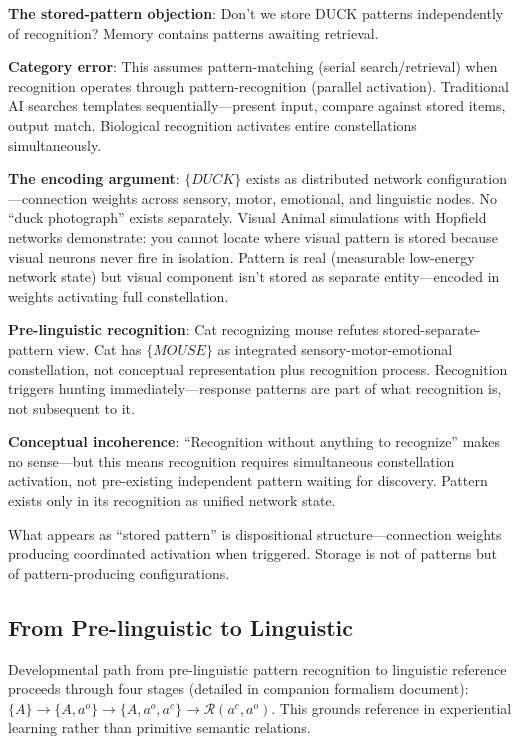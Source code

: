 \documentclass[12pt]{article}
\begin{document}
\textbf{The stored-pattern objection}: Don't we store DUCK patterns independently of recognition? Memory contains patterns awaiting retrieval.

\textbf{Category error}: This assumes pattern-matching (serial search/retrieval) when recognition operates through pattern-recognition (parallel activation). Traditional AI searches templates sequentially---present input, compare against stored items, output match. Biological recognition activates entire constellations simultaneously.

\textbf{The encoding argument}: \(\{DUCK\}\) exists as distributed network configuration---connection weights across sensory, motor, emotional, and linguistic nodes. No ``duck photograph'' exists separately. Visual Animal simulations with Hopfield networks demonstrate: you cannot locate where visual pattern is stored because visual neurons never fire in isolation. Pattern is real (measurable low-energy network state) but visual component isn't stored as separate entity---encoded in weights activating full constellation.

\textbf{Pre-linguistic recognition}: Cat recognizing mouse refutes stored-separate-pattern view. Cat has \(\{MOUSE\}\) as integrated sensory-motor-emotional constellation, not conceptual representation plus recognition process. Recognition triggers hunting immediately---response patterns are part of what recognition is, not subsequent to it.

\textbf{Conceptual incoherence}: ``Recognition without anything to recognize'' makes no sense---but this means recognition requires simultaneous constellation activation, not pre-existing independent pattern waiting for discovery. Pattern exists only in its recognition as unified network state.

What appears as ``stored pattern'' is dispositional structure---connection weights producing coordinated activation when triggered. Storage is not of patterns but of pattern-producing configurations.

\subsection{From Pre-linguistic to Linguistic}\label{from-pre-linguistic-to-linguistic}

Developmental path from pre-linguistic pattern recognition to linguistic reference proceeds through four stages (detailed in companion formalism document): \(\{A\} \rightarrow \{A, a^o\} \rightarrow \{A, a^o, a^c\} \rightarrow \mathcal{R}(a^c, a^o)\). This grounds reference in experiential learning rather than primitive semantic relations.
\end{document}
